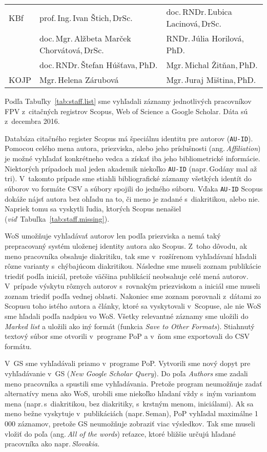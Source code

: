 \begin{table}
\begin{tabularx}{\textwidth}{lll}
    KBf  & prof.\,Ing.\,Ivan Štich,\,DrSc.               & doc.\,RNDr.\,Ľubica Lacinová,\,DrSc. \\
         & doc.\,Mgr.\,Alžbeta Marček Chorvátová,\,DrSc. & RNDr.\,Júlia Horilová,\,PhD.         \\
         & doc.\,RNDr.\,Štefan Húšťava,\,PhD.            & Mgr.\,Michal Žitňan,\,PhD.           \\[2ex]
    KOJP & Mgr.\,Helena Zárubová                         & Mgr.\,Juraj Miština,\,PhD.           \\
    \bottomrule
  \end{tabularx}
\end{table}

Podľa Tabuľky~\ref{tab:staff.list} sme vyhľadali záznamy jednotlivých
pracovníkov FPV z~citačných registrov Scopus, Web of Science a Google Scholar.
Dáta sú z~decembra 2016.

Databáza citačného register Scopus má špeciálnu identitu pre autorov
(\texttt{AU-ID}).  Pomocou celého mena autora, priezviska, alebo jeho
príslušnosti (ang.\,\emph{Affiliation}) je možné vyhľadať konkrétneho vedca a
získať iba jeho bibliometrické informácie.  Niektorých prípadoch mal jeden
akademik niekoľko \texttt{AU-ID} (napr.\,Godány mal až tri).  V~takomto prípade
sme stiahli bibliografické záznamy všetkých identít do súborov vo formáte CSV a
súbory spojili do jedného súboru.  Vďaka \texttt{AU-ID} Scopus dokáže nájsť
autora bez ohľadu na to, či meno je zadané s~diakritikou, alebo nie.  Napriek
tomu sa vyskytli ľudia, ktorých Scopus nenašiel
(\emph{viď}~Tabuľka~\ref{tab:staff.missing}).

WoS umožňuje vyhľadávať autorov len podľa priezviska a nemá taký prepracovaný
systém uloženej identity autora ako Scopus.  Z~toho dôvodu, ak meno pracovníka
obsahuje diakritiku, tak sme v~rozšírenom vyhľadávaní hľadali rôzne varianty
s~chýbajúcom diakritikou.  Následne sme museli zoznam publikácie triediť podľa
iniciál, pretože väčšina publikácií neobsahuje celé mená autorov.  V~prípade
výskytu rôznych autorov s~rovnakým priezviskom a iniciál sme museli zoznam
triediť podľa vednej oblasti.  Nakoniec sme zoznam porovnali z~dátami zo Scopusu
toho istého autora a články, ktoré sa vyskytovali v~Scopuse, ale nie WoS sme
hľadali podľa nadpisu vo WoS.  Všetky relevantné záznamy sme uložili do
\emph{Marked list} a uložili ako iný formát (funkcia \emph{Save to Other
  Formats}).  Stiahnutý textový súbor sme otvorili v~programe PoP a v~ňom sme
exportovali do CSV formátu.

V~GS sme vyhľadávali priamo v~programe PoP.  Vytvorili sme nový dopyt pre
vyhľadávanie v~GS (\emph{New Google Scholar Query}).  Do poľa \emph{Authors} sme
zadali meno pracovníka a spustili sme vyhľadávania.  Pretože program neumožňuje
zadať alternatívy mena ako WoS, urobili sme niekoľko hľadaní vždy s~iným
variantom mena (napr.\,s~diakritikou, bez diakritiky, s~krstným menom,
iniciálami).  Ak sa meno bežne vyskytuje v~publikáciách (napr.\,Seman), PoP
vyhľadal maximálne 1\,000 záznamov, pretože GS neumožňuje zobraziť viac
výsledkov.  Tak sme museli vložiť do poľa  (ang.\,\emph{All of
  the words}) reťazce, ktoré bližšie určujú hľadané pracovníka ako
napr.\,\emph{Slovakia}.

